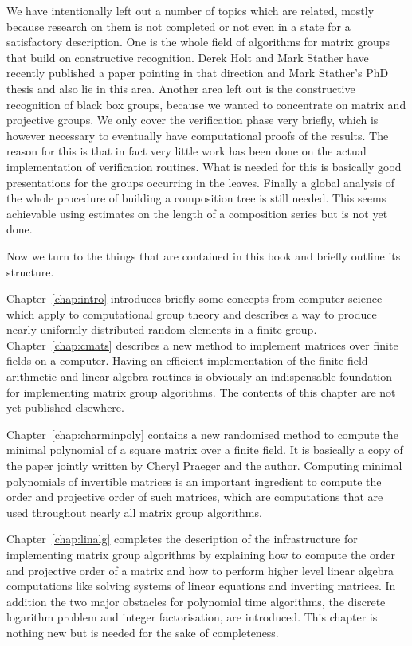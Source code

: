 We have intentionally left out a number of topics which are related, mostly
because research on them is not completed or not even in a state for a
satisfactory description. One is
the whole field of algorithms for matrix groups that build on constructive
recognition. Derek Holt and Mark Stather have recently published a paper
\cite{HoltStather} pointing in that direction and Mark Stather's PhD thesis
\cite{StatherPhd} and \cite{StatherSylow} also lie in this area. 
Another area left out is the
constructive recognition of black box groups, because we wanted to
concentrate on matrix and projective groups. We only cover the
verification phase very briefly, which is however necessary to eventually
have computational proofs of the results. The reason for this is that in
fact very little work has been done on the actual implementation of
verification routines. What is needed for this is basically good
presentations for the groups occurring in the leaves. 
Finally a global analysis of the
whole procedure of building a composition tree is still needed. This seems
achievable using estimates on the length of a composition series but is not
yet done.

Now we turn to the things that are contained in this book and briefly
outline its structure. 

Chapter~\ref{chap:intro} introduces briefly some concepts from computer
science which apply to computational group theory and describes a
way to produce nearly uniformly distributed random elements in a
finite group. Chapter~\ref{chap:cmats} describes a new method to
implement matrices over finite fields on a computer. Having an efficient
implementation of the finite field arithmetic and linear algebra
routines is obviously an indispensable foundation for implementing
matrix group algorithms. The contents of this chapter are not yet
published elsewhere.

Chapter~\ref{chap:charminpoly} contains a new randomised method to
compute the minimal polynomial of a square matrix over a finite field.
It is basically a copy of the paper \cite{minpolypaper} jointly
written by Cheryl Praeger and the author. Computing minimal
polynomials of invertible matrices is an important ingredient to compute the
order and projective order of such matrices, which are computations
that are used throughout nearly all matrix group algorithms.

Chapter~\ref{chap:linalg} completes the description of the
infrastructure for implementing matrix group algorithms by explaining
how to compute the order and projective order of a matrix and how to
perform higher level linear algebra computations like solving systems
of linear equations and inverting matrices. In addition the two
major obstacles for polynomial time algorithms, the discrete logarithm
problem and integer factorisation, are introduced. This chapter is
nothing new but is needed for the sake of completeness.

